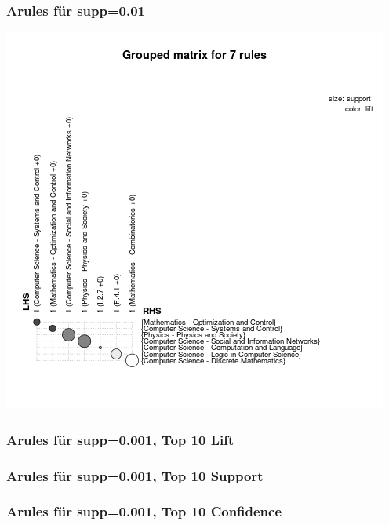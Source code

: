 \documentclass[12pt, xcolor=table]{beamer}
\begin{document}
\begin{frame}
	\frametitle{Arules für supp=0.01}
	\begin{center}
		\includegraphics[scale=0.5]{../../visual/plot_matrix_grouped_7rules.png}
	\end{center}
\end{frame}
\begin{frame}
    \frametitle{Arules für supp=0.001, Top 10 Lift}
    
\end{frame}
\begin{frame}
    \frametitle{Arules für supp=0.001, Top 10 Support}
    
\end{frame}
\begin{frame}
    \frametitle{Arules für supp=0.001, Top 10 Confidence}
    
\end{frame}
\end{document}
